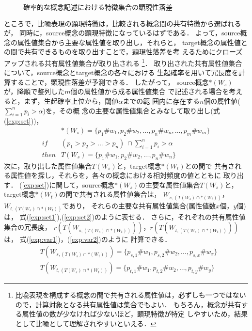 \begin{figure}[tb]
    \begin{center}
\caption{確率的な概念記述における特徴集合の顕現性落差}
\label{fig:rep-kage}
\end{center}
\end{figure}
ところで，比喩表現の顕現特徴は，比較される概念間の共有特徴から選ばれるが，
同時に，source概念の顕現特徴になっているはずである．
よって，source概念の属性値集合から主要な属性値を取り出し，それらと，
target概念の属性値との間で共有できるものを取り出すことで，顕現性落差を考
えるためにクローズアップされる共有属性値集合が取り出される
\footnote{
比喩表現を構成する概念の間で共有される属性値は，必ずしも一つではない
\cite{Kusumi1996ja}ので，計算対象となる共有属性値は集合でもよい．
もちろん，概念が共有する属性値の数が少なければ少ないほど，顕現特徴が特定
しやすいため，結果として比喩として理解されやすいといえる．}．
取り出された共有属性値集合について，source概念とtarget概念の各々における
生起確率を用いて冗長度を計算することで，顕現性落差が予測できる．
したがって，
source概念${\ast}(W_s)$ が，降順で整列した$m$個の属性値から成る属性値集合
で記述される場合を考えると，まず，生起確率上位から，閾値$\alpha$までの範
囲内に存在する$n$個の属性値(${\sum_{i=1}^{n}{p_i} > {\alpha}}$)を，その概
念の主要な属性値集合とみなして取り出し(式(\ref{exp:set}))，
\begin{eqnarray}
\label{exp:set}
	&{\ast}(W_s) = \{p_1\#w_1,p_2\#w_2,...,p_n\#w_n,...,p_m\#w_m\} \nonumber\\
	if &(p_1>p_2>...>p_n)\ \cap \sum_{i=1}^{n}{p_i} > \alpha\\
	 then &  T(W_s) = \{p_1\#w_1,p_2\#w_2,...,p_n\#w_n\} \nonumber
\end{eqnarray}
次に，取り出した属性値集合$T(W_s)$と，target概念${\ast}(W_t)$との間で
共有される属性値を探し，それらを，各々の概念における相対頻度の値とともに
取り出す．
(\ref{exp:set})に関して，source概念$\ast(W_s)$の主要な属性値集合$T(W_s)$と，
target概念${\ast}(W_t)$の間で共有される属性値集合は，
$W_{s,(T(W_s)\cap{\ast}(W_t))}$，$W_{t,(T(W_s)\cap{\ast}(W_t))}$であり，
それらの主要な共有属性値集合(属性値数$x$個，$y$個)は，
式(\ref{exp:set1}),(\ref{exp:set2})のように表せる．
さらに，それぞれの共有属性値集合の冗長度，
$r(T(W_{s,(T(W_s)\cap{\ast}(W_t))}))$，$r(T(W_{t,(T(W_s)\cap{\ast}(W_t))}))$は，
式(\ref{exp:var1})，(\ref{exp:var2})のように
計算できる．
\begin{eqnarray}
\label{exp:set1}
&T(W_{s,(T(W_s)\cap{\ast}(W_t))})
 = \{p_{s,1}\#w_1,p_{s,2}\#w_2,...,p_{s,x}\#w_x\} \\
\label{exp:set2}
&T(W_{t,(T(W_s)\cap{\ast}(W_t))})
 = \{p_{t,1}\#w_1,p_{t,2}\#w_2,...,p_{t,y}\#w_y\} 
\end{eqnarray}

